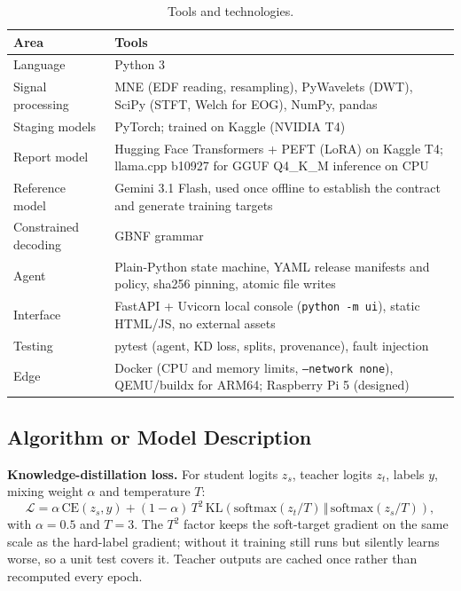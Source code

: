 \begin{table}[htbp]
\centering\small
\caption{Tools and technologies.}
\label{tab:tools}
\begin{tabularx}{\textwidth}{lY}
\toprule
Area & Tools \\
\midrule
Language & Python 3 \\
Signal processing & MNE (EDF reading, resampling), PyWavelets (DWT), SciPy (STFT, Welch for EOG), NumPy, pandas \\
Staging models & PyTorch; trained on Kaggle (NVIDIA T4) \\
Report model & Hugging Face Transformers + PEFT (LoRA) on Kaggle T4; llama.cpp b10927 for GGUF Q4\_K\_M inference on CPU \\
Reference model & Gemini 3.1 Flash, used once offline to establish the contract and generate training targets \\
Constrained decoding & GBNF grammar \\
Agent & Plain-Python state machine, YAML release manifests and policy, sha256 pinning, atomic file writes \\
Interface & FastAPI + Uvicorn local console (\texttt{python -m ui}), static HTML/JS, no external assets \\
Testing & pytest (agent, KD loss, splits, provenance), fault injection \\
Edge & Docker (CPU and memory limits, \texttt{--network none}), QEMU/buildx for ARM64; Raspberry Pi 5 (designed) \\
\bottomrule
\end{tabularx}
\end{table}

\subsection{Algorithm or Model Description}

\textbf{Knowledge-distillation loss.} For student logits $z_s$, teacher logits $z_t$, labels $y$, mixing weight
$\alpha$ and temperature $T$:
\begin{equation}
\mathcal{L} = \alpha\,\mathrm{CE}(z_s, y) + (1-\alpha)\,T^2\,\mathrm{KL}\!\left(\mathrm{softmax}(z_t/T)\,\Vert\,\mathrm{softmax}(z_s/T)\right),
\end{equation}
with $\alpha = 0.5$ and $T = 3$. The $T^2$ factor keeps the soft-target gradient on the same scale as the hard-label
gradient; without it training still runs but silently learns worse, so a unit test covers it. Teacher outputs are
cached once rather than recomputed every epoch.

